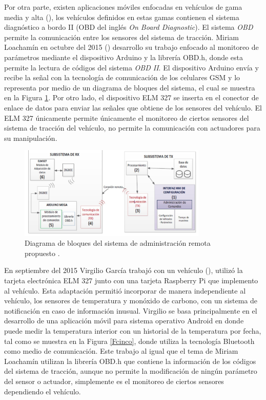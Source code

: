 Por otra parte, existen aplicaciones móviles enfocadas en vehículos de gama media y alta (\cite{UPS-07,UPS-08}), los vehículos definidos en estas gamas contienen el sistema diagnóstico a bordo II (OBD del inglés \textit{On Board Diagnostic}). El sistema \textit{OBD} permite la comunicación entre los sensores del sistema de tracción. Miriam Loachamín en octubre del 2015 (\cite{UPS-07}) desarrollo su trabajo enfocado al monitoreo de parámetros mediante el dispositivo Arduino y la librería OBD.h, donde esta permite la lectura de códigos del sistema \textit{OBD II}. El dispositivo Arduino envía y recibe la señal con la tecnología de comunicación de los celulares GSM y lo representa por medio de un diagrama de bloques del sistema, el cual se muestra en la Figura \ref{Fcuatro}. Por otro lado, el dispositivo ELM 327 se inserta en el conector de enlace de datos para enviar las señales que obtiene de los sensores del vehículo. El ELM 327 únicamente permite únicamente el monitoreo de ciertos sensores del sistema de tracción del vehículo, no permite la comunicación con actuadores para su manipulación.\\

%
\begin{figure}[H]
\centering
\includegraphics[width=0.8\textwidth]{introduccion/fig6.jpg}
\caption{Diagrama de bloques del sistema de administración remota propuesto \cite{UPS-07}. }
\label{Fcuatro}
\end{figure}
%


En septiembre del 2015 Virgilio García trabajó con un vehículo (\cite{UPS-08}), utilizó la tarjeta electrónica ELM 327 junto con una tarjeta Raspberry Pi que implemento al vehículo. Esta adaptación permitió incorporar de manera independiente al vehículo, los sensores de temperatura y monóxido de carbono, con un sistema de notificación en caso de información inusual. Virgilio se basa principalmente en el desarrollo de una aplicación móvil para sistema operativo Android en donde puede medir la temperatura interior con un historial de la temperatura por fecha, tal como se muestra en la Figura \ref{Fcinco}, donde utiliza la tecnología Bluetooth como medio de comunicación. Este trabajo al igual que el tema de Miriam Loachamín utilizan la librería OBD.h que contiene la información de los códigos del sistema de tracción, aunque no permite la modificación de ningún parámetro del sensor o actuador, simplemente es el monitoreo de ciertos sensores dependiendo el vehículo.\\

